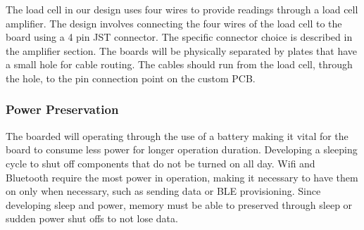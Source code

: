 The load cell in our design uses four wires to provide readings through a load cell amplifier. The design involves connecting the four wires of the load cell to the board using a 4 pin JST connector. The specific connector choice is described in the amplifier section. The boards will be physically separated by plates that have a small hole for cable routing. The cables should run from the load cell, through the hole, to the pin connection point on the custom PCB. 

\subsubsection{Power Preservation}

The boarded will operating through the use of a battery making it vital for the board to consume less power for longer operation duration. Developing a sleeping cycle to shut off components that do not be turned on all day. Wifi and Bluetooth require the most power in operation, making it necessary to have them on only when necessary, such as sending data or BLE provisioning. Since developing sleep and power, memory must be able to preserved through sleep or sudden power shut offs to not lose data.
